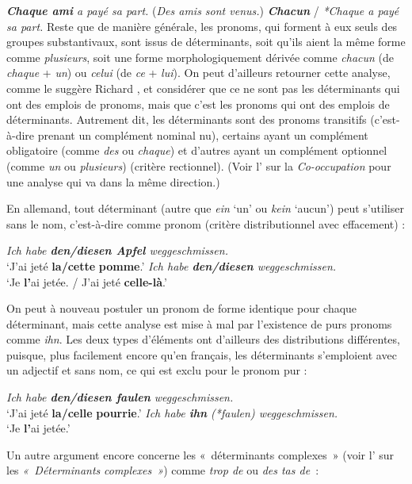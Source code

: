 \ea \textit{\textbf{{Chaque ami}}  {a payé sa part.}}
\ex (\textit{{Des amis sont venus.}}) \textit{\textbf{{Chacun} }}{/}  \textit{{*Chaque a payé sa part.}}
\z
Reste que de manière générale, les pronoms, qui forment à eux seuls des groupes substantivaux, sont issus de déterminants, soit qu’ils aient la même forme comme \textit{plusieurs}, soit une forme morphologiquement dérivée comme \textit{chacun} (de \textit{chaque} + \textit{un}) ou \textit{celui} (de \textit{ce} + \textit{lui}). On peut d’ailleurs retourner cette analyse, comme le suggère Richard \citet[192]{Hudson2007}, et considérer que ce ne sont pas les déterminants qui ont des emplois de pronoms, mais que c’est les pronoms qui ont des emplois de déterminants. Autrement dit, les déterminants sont des pronoms transitifs (c’est-à-dire prenant un complément nominal nu), certains ayant un complément obligatoire (comme \textit{des} ou \textit{chaque}) et d’autres ayant un complément optionnel (comme \textit{un} ou \textit{plusieurs}) (critère rectionnel). (Voir l’ sur la \textit{Co-occupation} pour une analyse qui va dans la même direction.)

En allemand, tout déterminant (autre que \textit{ein} ‘un’ ou \textit{kein} ‘aucun’) peut s’utiliser sans le nom, c’est-à-dire comme pronom (critère distributionnel avec effacement) :

\ea \textit{{Ich habe} \textbf{{den/diesen}  {Apfel}}  {weggeschmissen.}}\\
\glt ‘J’ai jeté \textbf{la/cette} \textbf{pomme}.’
\ex \textit{{Ich habe} \textbf{{den/diesen}}  {weggeschmissen.}}\\
\glt ‘Je \textbf{l’}ai jetée. / J’ai jeté \textbf{celle-là}.’
\z

On peut à nouveau postuler un pronom de forme identique pour chaque déterminant, mais cette analyse est mise à mal par l’existence de purs pronoms comme \textit{ihn}. Les deux types d’éléments ont d’ailleurs des distributions différentes, puisque, plus facilement encore qu’en français, les déterminants s’emploient avec un adjectif et sans nom, ce qui est exclu pour le pronom pur :

\ea \textit{{Ich habe} \textbf{{den/diesen}  {faulen} } {weggeschmissen.}}\\
\glt ‘J’ai jeté \textbf{la/celle} \textbf{pourrie}.’
\ex \textit{{Ich habe} \textbf{{ihn}} (*{faulen})  {weggeschmissen.}}\\
\glt ‘Je \textbf{l’}ai jetée.’
\z

Un autre argument encore concerne les «~déterminants complexes~» (voir l’ sur les \textit{«~Déterminants} \textit{complexes~»}) comme \textit{trop de} ou \textit{des tas de~}:

